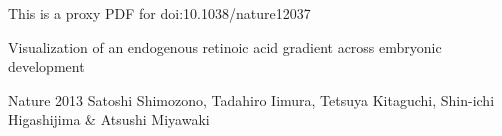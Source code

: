 \documentclass[letterpaper]{article}
\begin{document}
 
This is a proxy PDF for doi:10.1038/nature12037

Visualization of an endogenous retinoic acid gradient across embryonic development

Nature 2013
Satoshi Shimozono, Tadahiro Iimura, Tetsuya Kitaguchi, Shin-ichi Higashijima \& Atsushi Miyawaki
\end{document}
